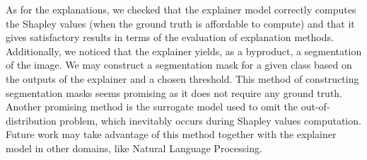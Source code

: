 \documentclass[magisterska,en]{pracamgr}
\begin{document}
As for the explanations, we checked that the explainer model correctly computes the Shapley values (when the ground truth is affordable to compute) and that it gives satisfactory results in terms of the evaluation of explanation methods. Additionally, we noticed that the explainer yields, as a byproduct, a segmentation of the image. We may construct a segmentation mask for a given class based on the outputs of the explainer and a chosen threshold. This method of constructing segmentation masks seems promising as it does not require any ground truth. Another promising method is the surrogate model used to omit the out-of-distribution problem, which inevitably occurs during Shapley values computation. Future work may take advantage of this method together with the explainer model in other domains, like Natural Language Processing.































\fi


















\printbibliography
\end{document}
